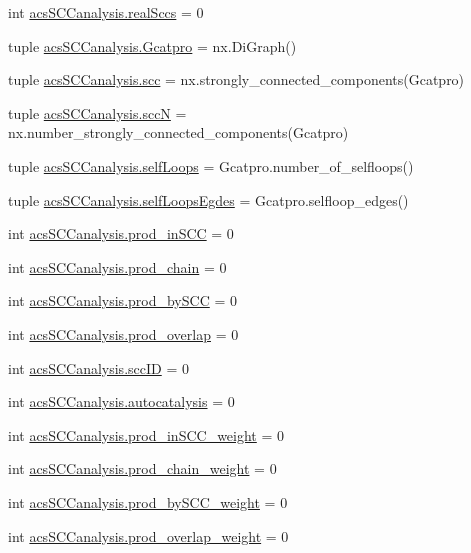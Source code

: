 \begin{DoxyCompactItemize}
\item 
int \hyperlink{a00102_ac6aaa0ac5d13b0736ab3179dc1ed388d}{acs\-S\-C\-Canalysis.\-real\-Sccs} = 0
\item 
tuple \hyperlink{a00102_ad88c3dd8eb89ddbe8720462b03f35003}{acs\-S\-C\-Canalysis.\-Gcatpro} = nx.\-Di\-Graph()
\item 
tuple \hyperlink{a00102_a2094b7f0917a16a948a2d1c4d700e84c}{acs\-S\-C\-Canalysis.\-scc} = nx.\-strongly\-\_\-connected\-\_\-components(Gcatpro)
\item 
tuple \hyperlink{a00102_a185cbf8ef1ec67f52695562582418793}{acs\-S\-C\-Canalysis.\-scc\-N} = nx.\-number\-\_\-strongly\-\_\-connected\-\_\-components(Gcatpro)
\item 
tuple \hyperlink{a00102_a8fec45ae9b70981ce94eaeed14d888b1}{acs\-S\-C\-Canalysis.\-self\-Loops} = Gcatpro.\-number\-\_\-of\-\_\-selfloops()
\item 
tuple \hyperlink{a00102_ad34596e89eef2cfb696f61a810765c7a}{acs\-S\-C\-Canalysis.\-self\-Loops\-Egdes} = Gcatpro.\-selfloop\-\_\-edges()
\item 
int \hyperlink{a00102_adbc76b0558ceb74d798b35146a583474}{acs\-S\-C\-Canalysis.\-prod\-\_\-in\-S\-C\-C} = 0
\item 
int \hyperlink{a00102_ab307c6047e4d16ec0335266b24e7db5a}{acs\-S\-C\-Canalysis.\-prod\-\_\-chain} = 0
\item 
int \hyperlink{a00102_abb2ac92624837ae48b882d145c5aab11}{acs\-S\-C\-Canalysis.\-prod\-\_\-by\-S\-C\-C} = 0
\item 
int \hyperlink{a00102_a213e964195f0666d00663ca874a09caa}{acs\-S\-C\-Canalysis.\-prod\-\_\-overlap} = 0
\item 
int \hyperlink{a00102_a1dd3c43841ba4485a66889600f099a0c}{acs\-S\-C\-Canalysis.\-scc\-I\-D} = 0
\item 
int \hyperlink{a00102_a70ccd5d519e878c6c8a7d0aa73caf46c}{acs\-S\-C\-Canalysis.\-autocatalysis} = 0
\item 
int \hyperlink{a00102_aa22adccedd9ae548d0687df507ebd92d}{acs\-S\-C\-Canalysis.\-prod\-\_\-in\-S\-C\-C\-\_\-weight} = 0
\item 
int \hyperlink{a00102_a6736365f1f19058f6e1d57287383dbcc}{acs\-S\-C\-Canalysis.\-prod\-\_\-chain\-\_\-weight} = 0
\item 
int \hyperlink{a00102_a5f45dbe461b3b18021c93780e87cc40e}{acs\-S\-C\-Canalysis.\-prod\-\_\-by\-S\-C\-C\-\_\-weight} = 0
\item 
int \hyperlink{a00102_ab78b07d6cd1a94356c4fee43dfc1272a}{acs\-S\-C\-Canalysis.\-prod\-\_\-overlap\-\_\-weight} = 0

\end{DoxyCompactItemize}
